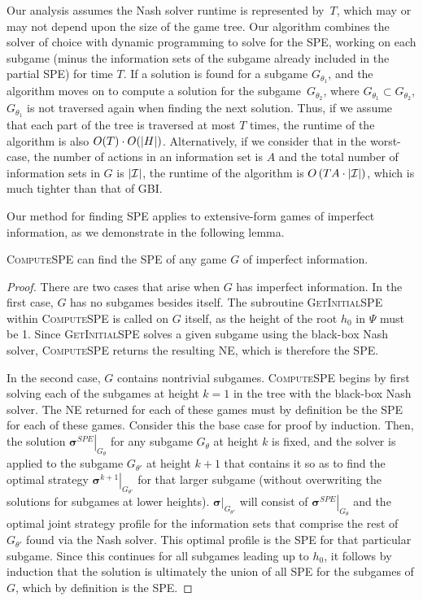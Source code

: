 Our analysis assumes the Nash solver runtime is represented by~$T$, which may or may not depend upon the size of the game tree.
Our algorithm combines the solver of choice with dynamic programming to solve for the SPE, working on each subgame (minus the information sets of the subgame already included in the partial SPE) for time $T$. If a solution is found for a subgame $G_{\theta_1}$, and the algorithm moves on to compute a solution for the subgame~$G_{\theta_2}$, where $G_{\theta_1} \subset G_{\theta_2}$, $G_{\theta_1}$ is not traversed again when finding the next solution.
Thus, if we assume that each part of the tree is traversed at most $T$ times, the runtime of the algorithm is also $O(T) \cdot O(\lvert H\rvert)$.
Alternatively, if we consider that in the worst-case, the number of actions in an information set is $A$ and the total number of information sets in $G$ is $\lvert\mathcal{I}\rvert$, the runtime of the algorithm is $O \left(T A \cdot \lvert\mathcal{I}\rvert \right)$, which is much tighter than that of GBI.

Our method for finding SPE applies to extensive-form games of imperfect information, as we demonstrate in the following lemma.

\begin{lemma}
\textsc{ComputeSPE} can find the SPE of any game $G$ of imperfect information.
\end{lemma}
\begin{proof}
There are two cases that arise when $G$ has imperfect information. In the first case, $G$ has no subgames besides itself. The subroutine \textsc{GetInitialSPE} within \textsc{ComputeSPE} is called on $G$ itself, as the height of the root $h_0$ in $\Psi$ must be 1. Since \textsc{GetInitialSPE} solves a given subgame using the black-box Nash solver, \textsc{ComputeSPE} returns the resulting NE, which is therefore the SPE.

In the second case, $G$ contains nontrivial subgames. \textsc{ComputeSPE} begins by first solving each of the subgames at height $k=1$ in the tree with the black-box Nash solver. The NE returned for each of these games must by definition be the SPE for each of these games. Consider this the base case for proof by induction. Then, the solution $\left.\bm{\sigma}^{SPE}\right|_{G_{\theta}}$ for any subgame $G_{\theta}$ at height $k$ is fixed, and the solver is applied to the subgame $G_{\theta'}$ at height $k + 1$ that contains it so as to find the optimal strategy $\left.\bm{\sigma}^{k+1}\right|_{G_{\theta'}}$ for that larger subgame (without overwriting the solutions for subgames at lower heights). $\left.\bm{\sigma}\right|_{G_{\theta'}}$ will consist of $\left.\bm{\sigma}^{SPE}\right|_{G_{\theta}}$ and the optimal joint strategy profile for the information sets that comprise the rest of $G_{\theta'}$ found via the Nash solver. This optimal profile is the SPE for that particular subgame. Since this continues for all subgames leading up to $h_0$, it follows by induction that the solution is ultimately the union of all SPE for the subgames of $G$, which by definition is the SPE. 
\end{proof}